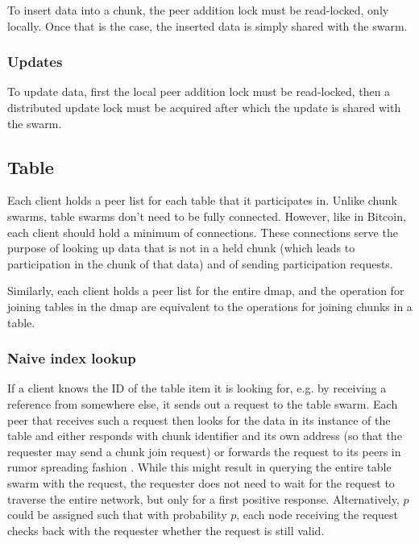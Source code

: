 \documentclass{article}
\begin{document}
To insert data into a chunk, the peer addition lock must be read-locked, only 
locally. Once that is the case, the inserted data is simply shared with the 
swarm.

\subsubsection{Updates}

To update data, first the local peer addition lock must be read-locked, then a 
distributed update lock must be acquired after which the update is shared with 
the swarm.

\subsection{Table}

Each client holds a peer list for each table that it participates in. Unlike
chunk swarms, table swarms don't need to be fully connected. However, like in
Bitcoin, each client should hold a minimum of connections. These connections
serve the purpose of looking up data that is not in a held chunk (which leads
to participation in the chunk of that data) and of sending participation
requests. 

Similarly, each client holds a peer list for the entire dmap, and the
operation for joining tables in the dmap are equivalent to the operations for
joining chunks in a table.

\subsubsection{Naive index lookup}

If a client knows the ID of the table item it is looking for, e.g. by receiving
a reference from somewhere else, it sends out a request to the table swarm. Each
peer that receives such a request then looks for the data in its instance of the
table and either responds with chunk identifier and its own address (so that the
requester may send a chunk join request) or forwards the request to its peers in
rumor spreading fashion \cite{bitcoin}. While this might result in querying the
entire table swarm with the request, the requester does not need to wait for the
request to traverse the entire network, but only for a first positive response.
Alternatively, $p$ could be assigned such that with probability $p$, each node
receiving the request checks back with the requester whether the request is
still valid.
\end{document}
